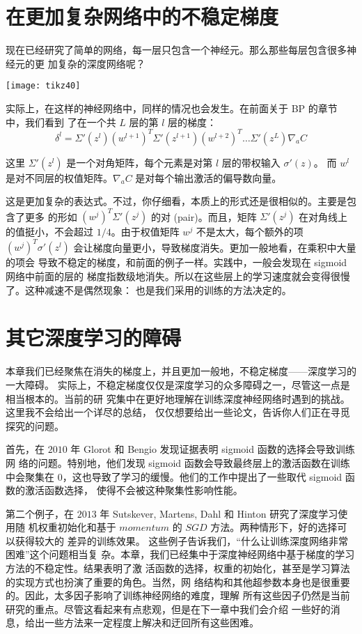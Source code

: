 \section{在更加复杂网络中的不稳定梯度}

现在已经研究了简单的网络，每一层只包含一个神经元。那么那些每层包含很多神经元的更
加复杂的深度网络呢？
\begin{center}
  \texttt{[image: tikz40]}
\end{center}
 
实际上，在这样的神经网络中，同样的情况也会发生。在前面关于 BP 的章节中，我们看到
了在一个共 $L$ 层的第 $l$ 层的梯度：
\begin{equation}
  \delta^l = \Sigma'(z^l) (w^{l+1})^T \Sigma'(z^{l+1}) (w^{l+2})^T \ldots
  \Sigma'(z^L) \nabla_a C
  \label{eq:124}\tag{124}
\end{equation}

这里 $\Sigma'(z^l)$ 是一个对角矩阵，每个元素是对第 $l$ 层的带权输入 $\sigma'(z)$。
而 $w^l$ 是对不同层的权值矩阵。$\nabla_{a} C$ 是对每个输出激活的偏导数向量。
 
这是更加复杂的表达式。不过，你仔细看，本质上的形式还是很相似的。主要是包含了更多
的形如 $(w^j)^T \Sigma' (z^j)$ 的对 (pair)。而且，矩阵 $\Sigma'(z^j)$ 在对角线上
的值挺小，不会超过 $1/4$。由于权值矩阵 $w^j$ 不是太大，每个额外的项 $(w^j)^T
\sigma' (z^l)$ 会让梯度向量更小，导致梯度消失。更加一般地看，在乘积中大量的项会
导致不稳定的梯度，和前面的例子一样。实践中，一般会发现在 sigmoid网络中前面的层的
梯度指数级地消失。所以在这些层上的学习速度就会变得很慢了。这种减速不是偶然现象：
也是我们采用的训练的方法决定的。

\section{其它深度学习的障碍}

本章我们已经聚焦在消失的梯度上，并且更加一般地，不稳定梯度——深度学习的一大障碍。
实际上，不稳定梯度仅仅是深度学习的众多障碍之一，尽管这一点是相当根本的。当前的研
究集中在更好地理解在训练深度神经网络时遇到的挑战。这里我不会给出一个详尽的总结，
仅仅想要给出一些论文，告诉你人们正在寻觅探究的问题。
 
首先，在 $2010$ 年 Glorot 和 Bengio 发现证据表明 sigmoid 函数的选择会导致训练网
络的问题。特别地，他们发现 sigmoid 函数会导致最终层上的激活函数在训练中会聚集在
$0$，这也导致了学习的缓慢。他们的工作中提出了一些取代 sigmoid 函数的激活函数选择，
使得不会被这种聚集性影响性能。
 
第二个例子，在 $2013$ 年 Sutskever, Martens, Dahl 和 Hinton 研究了深度学习使用随
机权重初始化和基于 $momentum$ 的 $SGD$ 方法。两种情形下，好的选择可以获得较大的
差异的训练效果。 这些例子告诉我们，“什么让训练深度网络非常困难”这个问题相当复
杂。本章，我们已经集中于深度神经网络中基于梯度的学习方法的不稳定性。结果表明了激
活函数的选择，权重的初始化，甚至是学习算法的实现方式也扮演了重要的角色。当然，网
络结构和其他超参数本身也是很重要的。因此，太多因子影响了训练神经网络的难度，理解
所有这些因子仍然是当前研究的重点。尽管这看起来有点悲观，但是在下一章中我们会介绍
一些好的消息，给出一些方法来一定程度上解决和迂回所有这些困难。
